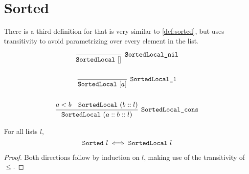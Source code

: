 \documentclass[sigplan,10pt,anonymous,review]{thesis}
\begin{document}
\nocite{*}


\clearpage

\appendix

\section{Sorted}
\label{appendix:sorted}

There is a third definition for  that is very similar to
\cref{def:sorted}, but uses transitivity to avoid parametrizing over
every element in the list.
\begin{definition}[SortedLocal]
  \begin{gather*}
    \infer[\var{SortedLocal\_nil}]{\var{SortedLocal}~[]}{}
    \\
    \\
    \infer[\var{SortedLocal\_1}]{\var{SortedLocal}~[a]}{}
    \\
    \\
    \infer[\var{SortedLocal\_cons}]{\var{SortedLocal}~(a :: b :: l)}{%
      a < b & \var{SortedLocal}~(b :: l)
    }
  \end{gather*}
\end{definition}

\begin{theorem}
  \label{thm:sortedlocal_iff}
  For all lists $l$,
  \begin{equation*}
    \texttt{\textup{Sorted}}~l \iff \texttt{\textup{SortedLocal}}~l
  \end{equation*}
\end{theorem}
\begin{proof}
  Both directions follow by induction on $l$, making use of the
  transitivity of $\le$.
\end{proof}
\end{document}
